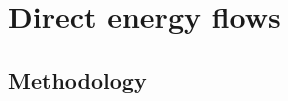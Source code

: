 %
%
%


\chapter{Direct energy flows}
\label{chap:direct_energy} 






\section{Methodology}
\label{sec:energy_methodology}

